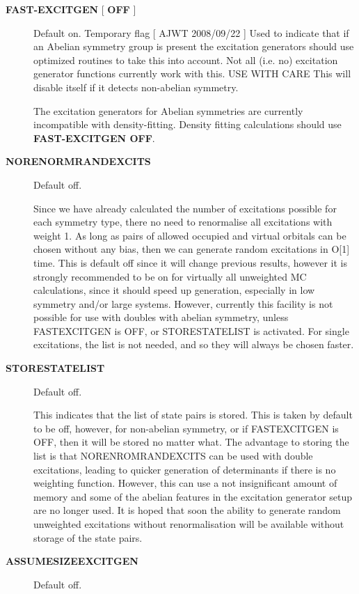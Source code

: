 \documentclass[openany,a4paper,10pt]{manual}
\begin{document}
\begin{description}
\item[\textbf{FAST-EXCITGEN}  {[} \textbf{OFF} {]}]
Default on.  Temporary flag {[} AJWT 2008/09/22 {]}
Used to indicate that if an Abelian symmetry group is present
the excitation generators should use optimized routines
to take this into account.  Not all (i.e. no) excitation generator functions
currently work with this.  USE WITH CARE
This will disable itself if it detects non-abelian symmetry.

\begin{notice}[warning]
The excitation generators for Abelian symmetries are currently incompatible
with density-fitting.  Density fitting calculations should use \textbf{FAST-EXCITGEN OFF}.
\end{notice}

\item[\textbf{NORENORMRANDEXCITS}]
Default off.

Since we have already calculated the number of excitations possible for each symmetry type, there
no need to renormalise all excitations with weight 1. As long as pairs of allowed occupied and
virtual orbitals can be chosen without any bias, then we can generate random excitations in O{[}1{]} time.
This is default off since it will change previous results, however it is strongly recommended to be
on for virtually all unweighted MC calculations, since it should speed up generation, especially in
low symmetry and/or large systems. However, currently this facility is not possible for use with doubles
with abelian symmetry, unless FASTEXCITGEN is OFF, or STORESTATELIST is activated. For single excitations,
the list is not needed, and so they will always be chosen faster.

\item[\textbf{STORESTATELIST}]
Default off.

This indicates that the list of state pairs is stored. This is taken by default to be off, however, for
non-abelian symmetry, or if FASTEXCITGEN is OFF, then it will be stored no matter what. The advantage to
storing the list is that NORENROMRANDEXCITS can be used with double excitations, leading to quicker
generation of determinants if there is no weighting function. However, this can use a not insignificant
amount of memory and some of the abelian features in the excitation generator setup are no longer used.
It is hoped that soon the ability to generate random unweighted excitations without renormalisation will
be available without storage of the state pairs.

\item[\textbf{ASSUMESIZEEXCITGEN}]
Default off.


\end{description}
\end{document}
